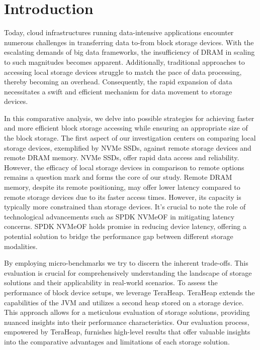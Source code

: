\section{Introduction}
Today, cloud infrastructures running data-intensive applications encounter numerous challenges in transferring data to-from block storage devices. With the escalating demands of big data frameworks, the insufficiency of DRAM in scaling to such magnitudes becomes apparent. Additionally, traditional approaches to accessing local storage devices struggle to match the pace of data processing, thereby becoming an overhead. Consequently, the rapid expansion of data necessitates a swift and efficient mechanism for data movement to storage devices. 

In this comparative analysis, we delve into possible strategies for achieving faster and more efficient block storage accessing while ensuring an appropriate size of the block storage. The first aspect of our investigation centers on comparing local storage devices, exemplified by NVMe SSDs, against remote storage devices and remote DRAM memory. NVMe SSDs, offer rapid data access and reliability. However, the efficacy of local storage devices in comparison to remote options remains a question mark and forms the core of our study. Remote DRAM memory, despite its remote positioning, may offer lower latency compared to remote storage devices due to its faster access times. However, its capacity is typically more constrained than storage devices. It's crucial to note the role of technological advancements such as SPDK NVMeOF in mitigating latency concerns. SPDK NVMeOF holds promise in reducing device latency, offering a potential solution to bridge the performance gap between different storage modalities. 

By employing micro-benchmarks we try to discern the inherent trade-offs. This evaluation is crucial for comprehensively understanding the landscape of storage solutions and their applicability in real-world scenarios. To assess the performance of block device setups, we leverage TeraHeap. TeraHeap extends the capabilities of the JVM and utilizes a second heap stored on a storage device. This approach allows for a meticulous evaluation of storage solutions, providing nuanced insights into their performance characteristics. Our evaluation process, empowered by TeraHeap, furnishes high-level results that offer valuable insights into the comparative advantages and limitations of each storage solution.


